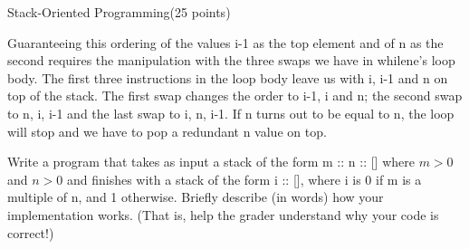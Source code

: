 \documentclass{article}
\begin{document}
\begin{question}{Stack-Oriented Programming}{(25 points)}
\begin{subquestion}
   Guaranteeing this ordering of the values i-1 as the top element and of n as the second requires the manipulation with the three swaps we have in whilene's loop body. The first three instructions in the loop body leave us with i, i-1 and n on top of the stack. The first swap changes the order to i-1, i and n; the second swap to n, i, i-1 and the last swap to i, n, i-1. If n turns out to be equal to n, the loop will stop and we have to pop a redundant n value on top.
    
  \end{subquestion}
  
  
  
  \begin{subquestion}
     Write a program that takes as input a stack of the form m :: n :: [] where $m \gt 0$ and $n \gt 0$ and finishes
    with a stack of the form i :: [], where i is 0 if m is a multiple of n, and 1 otherwise. Briefly describe
    (in words) how your implementation works. (That is, help the grader understand why your code is
    correct!)
    
  \end{subquestion}
  
    
\end{question}
\end{document}
